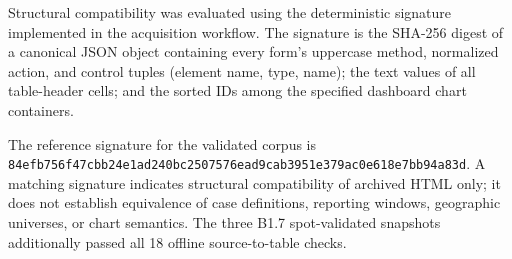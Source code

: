 Structural compatibility was evaluated using the deterministic signature implemented in the acquisition workflow. The signature is the SHA-256 digest of a canonical JSON object containing every form's uppercase method, normalized action, and control tuples (element name, type, name); the text values of all table-header cells; and the sorted IDs among the specified dashboard chart containers.

The reference signature for the validated corpus is \texttt{84efb756f47cbb24e1ad240bc2507576ead9cab3951e379ac0e618e7bb94a83d}. A matching signature indicates structural compatibility of archived HTML only; it does not establish equivalence of case definitions, reporting windows, geographic universes, or chart semantics. The three B1.7 spot-validated snapshots additionally passed all 18 offline source-to-table checks.
